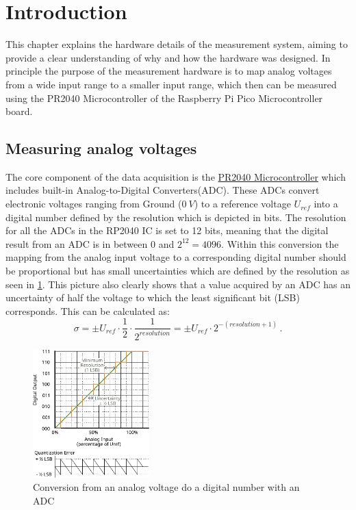 \section{Introduction}

This chapter explains the hardware details of the measurement system, aiming to provide a clear understanding of why and how the hardware was designed. In principle the purpose of the measurement hardware is to map analog voltages from a wide input range to a smaller input range, which then can be measured using the PR2040 Microcontroller of the Raspberry Pi Pico Microcontroller board.

\subsection{Measuring analog voltages}

The core component of the data acquisition is the \href{https://www.raspberrypi.com/documentation/microcontrollers/rp2040.html}{PR2040 Microcontroller} which includes built-in Analog-to-Digital Converters(ADC). These ADCs convert electronic voltages ranging from Ground ($\SI{0}{V}$) to a reference voltage $U_{ref}$ into a digital number defined by the resolution which is depicted in bits. The resolution for all the ADCs in the RP2040 IC is set to 12 bits, meaning that the digital result from an ADC is in between $0$ and $2^{12} = 4096$. Within this conversion the mapping from the analog input voltage to a corresponding digital number should be proportional but has small uncertainties which are defined by the resolution as seen in \cref{fig:ADC-Curve}. This picture also clearly shows that a value acquired by an ADC has an uncertainty of half the voltage to which the least significant bit (LSB) corresponds. This can be calculated as:
\begin{equation*}
	\sigma = \pm{} U_{ref} \cdot \frac{1}{2} \cdot \frac{1}{2^{resolution}} = \pm{} U_{ref} \cdot 2^{-(resolution + 1)}\,.
\end{equation*}

\begin{figure}[htb]
		\centering
		\includegraphics[width=0.4\textwidth]{./fig/ADC-conversion-curve-export.pdf}
		\caption{Conversion from an analog voltage do a digital number with an ADC}
		\label{fig:ADC-Curve}
\end{figure}

